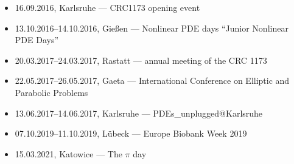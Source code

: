 \begin{itemize}
  \item 16.09.2016, Karlsruhe --- CRC1173 opening event
  \item 13.10.2016--14.10.2016, Gießen --- Nonlinear PDE days ``Junior Nonlinear PDE Days''
  \item 20.03.2017--24.03.2017, Rastatt ---  annual meeting of the CRC 1173
  \item 22.05.2017--26.05.2017, Gaeta --- International Conference on Elliptic and Parabolic Problems
  \item 13.06.2017--14.06.2017, Karlsruhe --- PDEs\_unplugged@Karlsruhe
  \item 07.10.2019--11.10.2019, Lübeck --- Europe Biobank Week 2019
  \item 15.03.2021, Katowice --- The $\pi$ day
\end{itemize}
